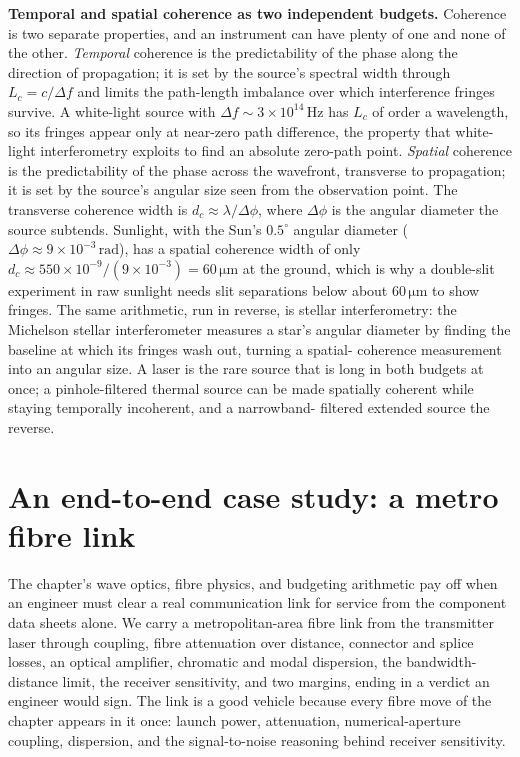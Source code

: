 \begin{mastery}
\textbf{Temporal and spatial coherence as two independent budgets.}
Coherence is two separate properties, and an instrument can have plenty of
one and none of the other. \emph{Temporal} coherence is the predictability of
the phase along the direction of propagation; it is set by the source's
spectral width through $L_{c} = c/\Delta f$ and limits the path-length
imbalance over which interference fringes survive. A white-light source with
$\Delta f \sim 3\times10^{14}\,\si{\hertz}$ has $L_{c}$ of order a wavelength,
so its fringes appear only at near-zero path difference, the property that
white-light interferometry exploits to find an absolute zero-path point.
\emph{Spatial} coherence is the predictability of the phase across the
wavefront, transverse to propagation; it is set by the source's angular size
seen from the observation point. The transverse coherence width is
$d_{c} \approx \lambda/\Delta\phi$, where $\Delta\phi$ is the angular diameter
the source subtends. Sunlight, with the Sun's $0.5^{\circ}$ angular diameter
($\Delta\phi \approx 9\times10^{-3}\,\si{\radian}$), has a spatial coherence
width of only $d_{c} \approx 550\times10^{-9}/(9\times10^{-3}) = 60\,\si{
\micro\meter}$ at the ground, which is why a double-slit experiment in raw
sunlight needs slit separations below about $60\,\si{\micro\meter}$ to show
fringes. The same arithmetic, run in reverse, is stellar interferometry: the
Michelson stellar interferometer measures a star's angular diameter by
finding the baseline at which its fringes wash out, turning a spatial-
coherence measurement into an angular size. A laser is the rare source that is
long in both budgets at once; a pinhole-filtered thermal source can be made
spatially coherent while staying temporally incoherent, and a narrowband-
filtered extended source the reverse.
\end{mastery}

\section{An end-to-end case study: a metro fibre link}

The chapter's wave optics, fibre physics, and budgeting arithmetic pay off
when an engineer must clear a real communication link for service from the
component data sheets alone. We carry a metropolitan-area fibre link from the
transmitter laser through coupling, fibre attenuation over distance,
connector and splice losses, an optical amplifier, chromatic and modal
dispersion, the bandwidth-distance limit, the receiver sensitivity, and two
margins, ending in a verdict an engineer would sign. The link is a good
vehicle because every fibre move of the chapter appears in it once: launch
power, attenuation, numerical-aperture coupling, dispersion, and the
signal-to-noise reasoning behind receiver sensitivity.

